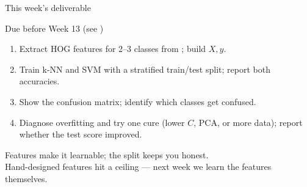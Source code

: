 \documentclass[10pt,aspectratio=169]{beamer}
\begin{document}
\begin{frame}{This week's deliverable}
  \begin{alertblock}{Due before Week 13 (see )}
    \begin{enumerate}
      \item Extract HOG features for 2--3 classes from ; build $X, y$.
      \item Train k-NN and SVM with a stratified train/test split; report both accuracies.
      \item Show the confusion matrix; identify which classes get confused.
      \item Diagnose overfitting and try one cure (lower $C$, PCA, or more data); report whether the test score improved.
    \end{enumerate}
  \end{alertblock}
\end{frame}

\begin{frame}[standout]
  Features make it learnable; the split keeps you honest.\\[4pt]
  \normalsize Hand-designed features hit a ceiling — next week we learn the features themselves.
\end{frame}
\end{document}
